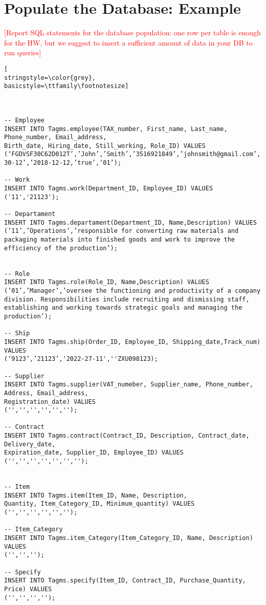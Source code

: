 
\section{Populate the Database: Example}
\textcolor{red}{[Report SQL statements for the database population: one row per table is enough for the HW, but we suggest to insert a sufficient amount of data in your DB to run queries]}


\begin{lstlisting}[
stringstyle=\color{grey},
basicstyle=\ttfamily\footnotesize]



-- Employee
INSERT INTO Tagms.employee(TAX_number, First_name, Last_name, Phone_number, Email_address,
Birth_date, Hiring_date, Still_working, Role_ID) VALUES
(‘FGDVSF30C62D012T’,’John’,’Smith’,’3516921849’,’johnsmith@gmail.com’,’1995-30-12’,’2018-12-12,’true’,’01’);

-- Work
INSERT INTO Tagms.work(Department_ID, Employee_ID) VALUES 
('11','21123');

-- Departament
INSERT INTO Tagms.departament(Department_ID, Name,Description) VALUES (’11’,’Operations’,’responsible for converting raw materials and packaging materials into finished goods and work to improve the efficiency of the production’);


-- Role
INSERT INTO Tagms.role(Role_ID, Name,Description) VALUES 
(’01’,’Manager’,’oversee the functioning and productivity of a company division. Responsibilities include recruiting and dismissing staff, establishing and working towards strategic goals and managing the production’);

-- Ship
INSERT INTO Tagms.ship(Order_ID, Employee_ID, Shipping_date,Track_num) VALUES 
(‘9123’,’21123’,'2022-27-11',''ZXU098123);

-- Supplier
INSERT INTO Tagms.supplier(VAT_numeber, Supplier_name, Phone_number, Address, Email_address,
Registration_date) VALUES
('','','','','','');

-- Contract
INSERT INTO Tagms.contract(Contract_ID, Description, Contract_date, Delivery_date,
Expiration_date, Supplier_ID, Employee_ID) VALUES 
('','','','','','','');


-- Item
INSERT INTO Tagms.item(Item_ID, Name, Description,
Quantity, Item_Category_ID, Minimum_quantity) VALUES 
('','','','','','');

-- Item_Category
INSERT INTO Tagms.item_Category(Item_Category_ID, Name, Description) VALUES
('','','');

-- Specify
INSERT INTO Tagms.specify(Item_ID, Contract_ID, Purchase_Quantity, Price) VALUES
('','','','');



\end{lstlisting}
